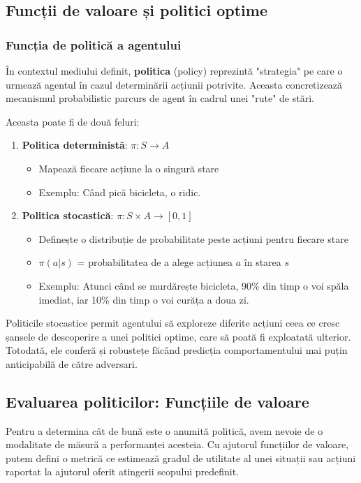 \subsection{Funcții de valoare și politici optime}
\subsubsection{Funcția de politică a agentului}
În contextul mediului definit, \textbf{politica} (policy) reprezintă "strategia" pe care o urmează agentul în cazul determinării acțiunii potrivite. Aceasta concretizează mecanismul probabilistic parcurs de agent în cadrul unei "rute" de stări.

Aceasta poate fi de două feluri:
\begin{enumerate}
    \item \textbf{Politica deterministă}: $\pi:S \xrightarrow{} A$
    \begin{itemize}
        \item Mapează fiecare acțiune la o singură stare
        \item Exemplu: Când pică bicicleta, o ridic.
    \end{itemize}
    \item \textbf{Politica stocastică}:  $\pi:S \times A \xrightarrow{} [0, 1]$
    \begin{itemize}
        \item Definește o distribuție de probabilitate peste acțiuni pentru fiecare stare
        \item $\pi(a|s)$ = probabilitatea de a alege acțiunea $a$ în starea $s$
        \item Exemplu: Atunci când se murdărește bicicleta, 90\% din timp o voi spăla imediat, iar 10\% din timp o voi curăța a doua zi.
    \end{itemize}
\end{enumerate}

Politicile stocastice permit agentului să exploreze diferite acțiuni ceea ce cresc șansele de descoperire a unei politici optime, care să poată fi exploatată ulterior. Totodată, ele conferă și robustețe făcând predicția comportamentului mai puțin anticipabilă de către adversari.

\subsection{Evaluarea politicilor: Funcțiile de valoare}
Pentru a determina cât de bună este o anumită politică, avem nevoie de o modalitate de măsură a performanței acesteia. Cu ajutorul funcțiilor de valoare, putem defini o metrică ce estimează gradul de utilitate al unei situații sau acțiuni raportat la ajutorul oferit atingerii scopului predefinit.

